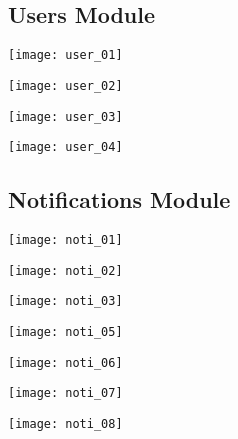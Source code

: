 \documentclass[11pt]{article}
\begin{document}
\subsection{Users Module}

\centerline{\texttt{[image: user\_01]}}
\newpage
\centerline{\texttt{[image: user\_02]}}
\newpage
\centerline{\texttt{[image: user\_03]}}
\newpage
\centerline{\texttt{[image: user\_04]}}
\newpage

\subsection{Notifications Module}

\centerline{\texttt{[image: noti\_01]}}
\newpage
\centerline{\texttt{[image: noti\_02]}}
\newpage
\centerline{\texttt{[image: noti\_03]}}
\newpage
\centerline{\texttt{[image: noti\_05]}}
\newpage
\centerline{\texttt{[image: noti\_06]}}
\newpage
\centerline{\texttt{[image: noti\_07]}}
\newpage
\centerline{\texttt{[image: noti\_08]}}
\end{document}
